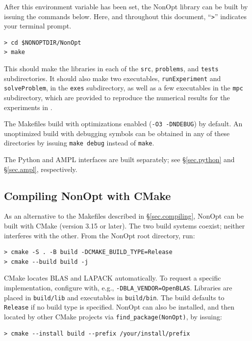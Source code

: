 \documentclass{article}
\begin{document}
After this environment variable has been set, the NonOpt library can be built by issuing the commands below.  Here, and throughout this document, ``\texttt{>}'' indicates your terminal prompt.

\begin{verbatim}
> cd $NONOPTDIR/NonOpt
> make
\end{verbatim}

This should make the libraries in each of the \texttt{src}, \texttt{problems}, and \texttt{tests} subdirectories.  It should also
make two executables, \texttt{runExperiment} and \texttt{solveProblem}, in the \texttt{exes} subdirectory, as well as a few executables in the \texttt{mpc} subdirectory, which are provided to reproduce the numerical results for the experiments in \cite{CurtZebi2026}.

The Makefiles build with optimizations enabled (\texttt{-O3 -DNDEBUG}) by default.  An unoptimized build with debugging symbols can be obtained in any of these directories by issuing \texttt{make debug} instead of \texttt{make}.

The Python and AMPL interfaces are built separately; see \S\ref{sec.python} and \S\ref{sec.ampl}, respectively.

\subsection{Compiling NonOpt with CMake}\label{sec.cmake}

As an alternative to the Makefiles described in \S\ref{sec.compiling}, NonOpt can be built with CMake (version 3.15 or later).  The two build systems coexist; neither interferes with the other.  From the NonOpt root directory, run:

\begin{verbatim}
> cmake -S . -B build -DCMAKE_BUILD_TYPE=Release
> cmake --build build -j
\end{verbatim}

CMake locates BLAS and LAPACK automatically.  To request a specific implementation, configure with, e.g., \texttt{-DBLA\_VENDOR=OpenBLAS}.  Libraries are placed in \texttt{build/lib} and executables in \texttt{build/bin}.  The build defaults to \texttt{Release} if no build type is specified.  NonOpt can also be installed, and then located by other CMake projects via \texttt{find\_package(NonOpt)}, by issuing:

\begin{verbatim}
> cmake --install build --prefix /your/install/prefix
\end{verbatim}
\end{document}
